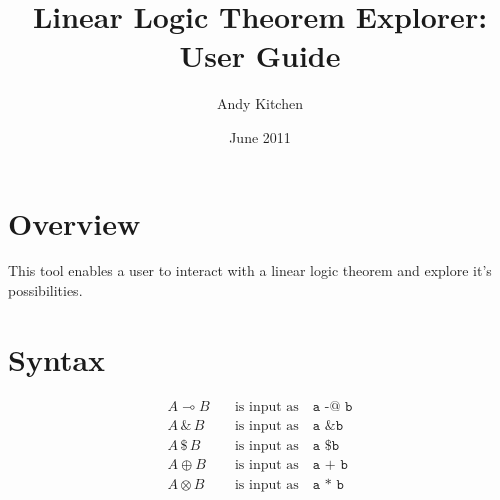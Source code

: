 \documentclass[]{article}
\title{Linear Logic Theorem Explorer: User Guide}
\author{Andy Kitchen}
\date{June 2011}
\begin{document}
\maketitle

\section{Overview}

This tool enables a user to interact with a linear logic theorem and
explore it's possibilities.

\section{Syntax}

\begin{align*}
A \multimap B  &\quad \mbox{is input as} \quad \texttt{a -@ b} \\
A \,\&\, B     &\quad \mbox{is input as} \quad \texttt{a \& b} \\
A \,\$\, B     &\quad \mbox{is input as} \quad \texttt{a \$ b} \\
A \oplus B     &\quad \mbox{is input as} \quad \texttt{a + b}  \\
A \otimes B    &\quad \mbox{is input as} \quad \texttt{a * b}
\end{align*}
\end{document}
